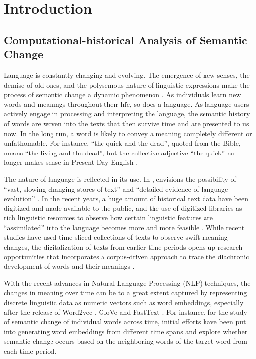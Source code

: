 

\chapter{Introduction}
\section{Computational-historical Analysis of Semantic Change}
Language is constantly changing and evolving. The emergence of new senses, the demise of old ones, and the polysemous nature of linguistic expressions make the process of semantic change a dynamic phenomenon \parencite{robertinvanhove2008}. As individuals learn new words and meanings throughout their life, so does a language. As language users actively engage in processing and interpreting the language, the semantic history of words are woven into the texts that then survive time and are presented to us now. In the long run, a word is likely to convey a meaning completely different or unfathomable. For instance, ``the quick and the dead'', quoted from the Bible, means ``the living and the dead'', but the collective adjective ``the quick'' no longer makes sense in Present-Day English \parencite[199]{semanticincrowley2010}.

The nature of language is reflected in its use. In \citeyear{sinclair1982reflections}, \citeauthor{sinclair1982reflections} envisions the possibility of ``vast, slowing changing stores of text'' and ``detailed evidence of language evolution'' . In the recent years, a huge amount of historical text data have been digitized and made available to the public, and the use of digitized libraries as rich linguistic resources to observe how certain linguistic features are ``assimilated'' into the language becomes more and more feasible \parencite{renouf2002time}. While recent studies have used time-sliced collections of texts to observe swift meaning changes, the digitalization of texts from earlier time periods opens up research opportunities that incorporates a corpus-driven approach to trace the diachronic development of words and their meanings \parencite{kutuzov2018survey,tahmasebi2018survey,camacho2018survey}.

With the recent advances in Natural Language Processing (NLP) techniques, the changes in meaning over time can be to a great extent captured by representing discrete linguistic data as numeric vectors such as word embeddings, especially after the release of Word2vec \parencite{mikolov2013efficient}, GloVe \parencite{pennington2014glove} and FastText \parencite{bojanowski2016enriching}. For instance, for the study of semantic change of individual words across time, initial efforts have been put into generating word embeddings from different time spans and explore whether semantic change occurs based on the neighboring words of the target word from each time period.

